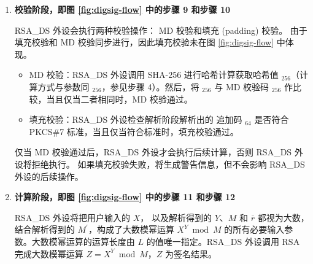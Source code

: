 \documentclass[main\_\_CN.tex]{subfiles}
\begin{document}
\begin{enumerate}
    \item {\bfseries 校验阶段，即图 \ref{fig:digsig-flow} 中的步骤 9 和步骤 10}

        RSA\_DS 外设会执行两种校验操作： MD 校验和填充 (padding) 校验。
        由于填充校验和 MD 校验同步进行，因此填充校验未在图 \ref{fig:digsig-flow} 中体现。


        \begin{itemize}

            \item MD 校验：RSA\_DS 外设调用 SHA-256 进行哈希计算获取哈希值 \begin{math}[CALC\_MD]_{256}\end{math}（计算方式与参数同 \begin{math}[MD]_{256}\end{math}，参见步骤 4）。然后，将 \begin{math}[CALC\_MD]_{256}\end{math} 与 MD 校验码 \begin{math}[MD]_{256}\end{math} 作比较，当且仅当二者相同时，MD 校验通过。

            \item 填充校验：RSA\_DS 外设检查解析阶段解析出的 追加码 \begin{math}[\beta]_{64} \end{math} 是否符合 PKCS\#7 标准，当且仅当符合标准时，填充校验通过。

        \end{itemize}

        仅当 MD 校验通过后，RSA\_DS 外设才会执行后续计算，否则 RSA\_DS 外设将拒绝执行。
        如果填充校验失败，将生成警告信息，但不会影响 RSA\_DS 外设的后续操作。

    \item {\bfseries 计算阶段，即图 \ref{fig:digsig-flow} 中的步骤 11 和步骤 12}

        RSA\_DS 外设将把用户输入的 \begin{math}X\end{math}，
        以及解析得到的 \begin{math}Y\end{math}、\begin{math}M\end{math} 和 \begin{math}\overline{r}\end{math} 都视为大数，结合解析得到的 \begin{math}M^{\prime}\end{math}，构成了大数模幂运算 \begin{math} X^{Y} \bmod M\end{math} 的所有必要输入参数。大数模幂运算的运算长度由 \begin{math}L\end{math} 的值唯一指定。RSA\_DS 外设调用 RSA 完成大数模幂运算 \begin{math}Z = X^{Y} \bmod M\end{math}，\begin{math}Z\end{math} 为签名结果。

\end{enumerate}
\end{document}
